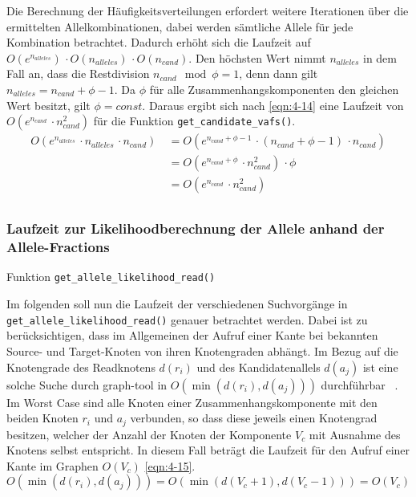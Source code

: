 Die Berechnung der Häufigkeitsverteilungen erfordert weitere Iterationen über die ermittelten Allelkombinationen, dabei werden sämtliche Allele für jede Kombination betrachtet. Dadurch erhöht sich die Laufzeit auf $ O(e^{n_{alleles}})\, \cdotp O(n_{alleles}) \, \cdotp O(n_{cand}) $. Den höchsten Wert nimmt $ n_{alleles} $ in dem Fall an, dass die Restdivision $ n_{cand} \mod \phi = 1 $, denn dann gilt  $ n_{alleles} = n_{cand} + \phi - 1 $. Da $\phi$ für alle Zusammenhangskomponenten den gleichen Wert besitzt, gilt $\phi = const$. Daraus ergibt sich nach \eqref{eqn:4-14} eine Laufzeit von $ O(e^{n_{cand}}\, \cdotp n_{cand}^2) $ für die Funktion  \lstinline|get_candidate_vafs()|.
\begin{equation} \label{eqn:4-14}
\tag{4-14}
\begin{aligned}
O(e^{n_{alleles}} \, \cdotp n_{alleles} \, \cdotp n_{cand}) 
&\ {}= O(e^{n_{cand} + \phi - 1} \, \cdotp (n_{cand} + \phi - 1) \, \cdotp n_{cand})\\
&\ = O(e^{n_{cand} + \phi}\, \cdotp n_{cand}^2) \, \cdotp \phi\\
&\ = O(e^{n_{cand}}\, \cdotp n_{cand}^2)\\
\end{aligned}
\end{equation} 

\subsubsection{Laufzeit zur Likelihoodberechnung der Allele anhand der Allele-Fractions}

Funktion \lstinline|get_allele_likelihood_read()|

Im folgenden soll nun die Laufzeit der verschiedenen Suchvorgänge in \linebreak \lstinline|get_allele_likelihood_read()| genauer betrachtet werden. Dabei ist zu berücksichtigen, dass im Allgemeinen der Aufruf einer Kante bei bekannten Source- und Target-Knoten von ihren Knotengraden abhängt. Im Bezug auf die Knotengrade des Readknotens $d(r_{i}) $  und des Kandidatenallels $d(a_{j}) $ ist eine solche Suche durch graph-tool in $O(\min (d(r_{i}), d(a_{j})))$ durchführbar ~\cite{docs_graph_tool}. Im Worst Case sind alle Knoten einer Zusammenhangskomponente mit den beiden Knoten $r_{i}$ und $a_{j}$ verbunden, so dass diese jeweils einen Knotengrad besitzen, welcher der Anzahl der Knoten der Komponente $V_{c}$ mit Ausnahme des Knotens selbst entspricht. In diesem Fall beträgt die Laufzeit für den Aufruf einer Kante im Graphen $ O(V_{c}) $ \eqref{eqn:4-15}.
\begin{equation} \label{eqn:4-15}
\tag{4-15}
O(\min (d(r_{i}), d(a_{j}))) =O(\min (d(V_{c}+1), d(V_{c}-1)))= O(V_{c})
\end{equation} 

